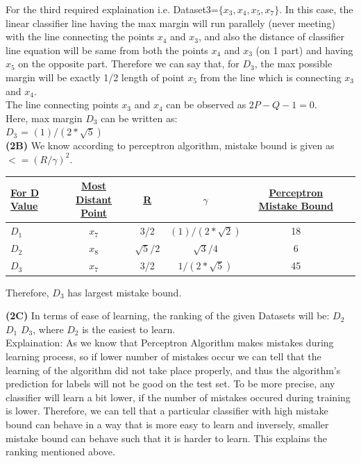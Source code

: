 \documentclass[11pt]{article}
\renewcommand\part[1]{\vspace{.10in}\textbf{(#1)}}
\begin{document}
For the third required explaination i.e. Dataset3=$\{x_3,x_4,x_5,x_7\}$. In this case, the linear classifier line having the max margin will run parallely (never meeting) with the line connecting the points $x_4$ and $x_3$, and also the distance of classifier line equation will be same from both the points $x_4$ and $x_3$ (on 1 part) and having $x_5$ on the opposite part. Therefore we can say that, for $D_3$, the max possible margin will be exactly 1/2 length of point $x_5$ from the line which is connecting $x_3$ and $x_4$.\\
The line connecting points $x_3$ and $x_4$ can be observed as $2P - Q - 1 = 0$.\\
Here, max margin $D_3$ can be written as:\\
$D_{3}$ = $ (1)/(2*\sqrt {5})$ \\ [15pt]
 
\part{2B}
We know according to perceptron algorithm, mistake bound is given as $<= (R/\gamma)^2$.\\

\bgroup 
\def\arraystretch{1.5}
\begin{tabular}{|l|c|c|c|c|c|} \hline 
{\bf \underline {For D Value}} & {\bf \underline {Most Distant Point}} & {\bf \underline {R}} & {\bf \underline {$\gamma$}} & {\bf \underline {Perceptron Mistake Bound}} \\ \hline
$D_1$ & $x_7$ & 3/2 & $(1)/(2*\sqrt{2})$ & 18 \\ \hline
$D_2$ & $x_8$ & $\sqrt{5}/2$ & $\sqrt{3}/4$ & $6$ \\ \hline
$D_3$ & $x_7$ & 3/2 & $1/(2*\sqrt {5})$ & 45 \\ \hline

\end{tabular}
\egroup

Therefore, $D_3$ has largest mistake bound. \newline


\part{2C}
In terms of ease of learning, the ranking of the given Datasets will be:
$D_2$ $D_1$ $D_3$, where $D_2$ is the easiest to learn.\\
Explaination: As we know that Perceptron Algorithm makes mistakes during learning process, so if lower number of mistakes occur we can tell that the learning of the algorithm did not take place properly, and thus the algorithm's prediction for labels will not be good on the test set. To be more precise, any classifier will learn a bit lower, if the number of mistakes occured during training is lower. Therefore, we can tell that a particular classifier with high mistake bound can behave in a way that is more easy to learn and inversely, smaller mistake bound can behave such that it is harder to learn. This explains the ranking mentioned above.\\
\end{document}
